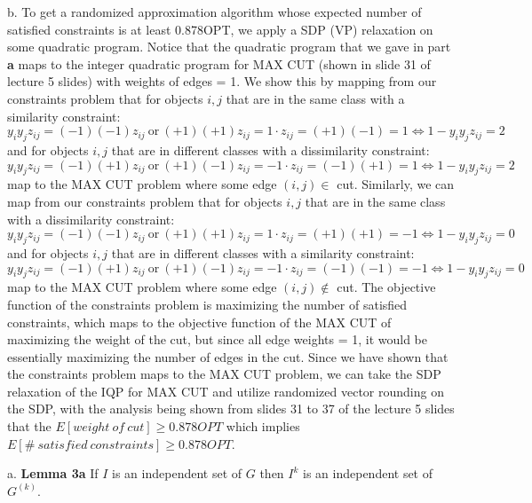 \documentclass[oneside]{projectpaper} %
\begin{document}
{\large b.} To get a randomized approximation algorithm whose expected number of satisfied constraints is at least 0.878OPT, we apply a SDP (VP) relaxation on some quadratic program. Notice that the quadratic program that we gave in part \textbf{a} maps to the integer quadratic program for MAX CUT (shown in slide 31 of lecture 5 slides) with weights of edges = 1. We show this by mapping from our constraints problem that for objects $i, j$ that are in the same class with a similarity constraint: $$y_i y_j z_{ij} = (-1)(-1)z_{ij} \ \text{or} \ (+1)(+1)z_{ij} = 1 \cdot z_{ij} = (+1)(-1) = 1 \Leftrightarrow 1 - y_i y_j z_{ij} = 2$$ and for objects $i, j$ that are in different classes with a dissimilarity constraint: $$y_i y_j z_{ij} = (-1)(+1)z_{ij} \ \text{or} \ (+1)(-1)z_{ij} = -1 \cdot z_{ij} = (-1)(+1) = 1 \Leftrightarrow 1 - y_i y_j z_{ij} = 2$$ map to the MAX CUT problem where some edge $(i,j) \in$ cut. Similarly, we can map from our constraints problem that for objects $i, j$ that are in the same class with a dissimilarity constraint: $$y_i y_j z_{ij} = (-1)(-1)z_{ij} \ \text{or} \ (+1)(+1)z_{ij} = 1 \cdot z_{ij} = (+1)(+1) = -1 \Leftrightarrow 1 - y_i y_j z_{ij} = 0$$ and for objects $i, j$ that are in different classes with a similarity constraint: $$y_i y_j z_{ij} = (-1)(+1)z_{ij} \ \text{or} \ (+1)(-1)z_{ij} = -1 \cdot z_{ij} = (-1)(-1) = -1 \Leftrightarrow 1 - y_i y_j z_{ij} = 0$$ map to the MAX CUT problem where some edge $(i,j) \notin$ cut. The objective function of the constraints problem is maximizing the number of satisfied constraints, which maps to the objective function of the MAX CUT of maximizing the weight of the cut, but since all edge weights = 1, it would be essentially maximizing the number of edges in the cut. 
\newline
\newline
Since we have shown that the constraints problem maps to the MAX CUT problem, we can take the SDP relaxation of the IQP for MAX CUT and utilize randomized vector rounding on the SDP, with the analysis being shown from slides 31 to 37 of the lecture 5 slides that the $E[weight \ of \ cut] \geq 0.878 OPT$ which implies $E[\# \ satisfied \ constraints] \geq 0.878 OPT$.

{\large a.} \textbf{Lemma 3a} If $I$ is an independent set of $G$ then $I^k$ is an independent set of $G^{(k)}$.
\newline
\end{document}
